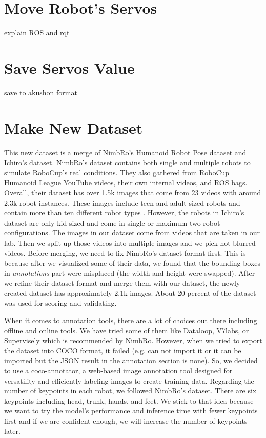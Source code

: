 \section{Move Robot's Servos}
\label{sec:move-robot-servo}

explain ROS and rqt


\section{Save Servos Value}
\label{sec:save-servo-value}

save to akushon format

\section{Make New Dataset}
\label{sec:makenewdataset}

This new dataset is a merge of NimbRo's Humanoid Robot Pose dataset and Ichiro's dataset. NimbRo's dataset contains both single and multiple robots to
simulate RoboCup's real conditions. They also gathered from RoboCup Humanoid League YouTube videos, their own internal videos, and ROS bags. 
Overall, their dataset has over 1.5k images that come from 23 videos with around 2.3k robot instances. These images include teen and adult-sized robots and contain more than ten different robot types \parencite{amini2021}.
However, the robots in Ichiro's dataset are only kid-sized and come in single or maximum two-robot configurations. The images in our dataset come from videos that are taken in our lab. 
Then we split up those videos into multiple images and we pick not blurred videos.
Before merging, we need to fix NimbRo's dataset format first. This is because after we visualized some of their data, we found that the bounding boxes in \emph{annotations} part were misplaced (the width and height were swapped).
After we refine their dataset format and merge them with our dataset, the newly created dataset has approximately 2.1k images.
About 20 percent of the dataset was used for scoring and validating.

When it comes to annotation tools, there are a lot of choices out there including offline and online tools. We have tried some of them like Dataloop, V7labs, or Supervisely which is recommended by NimbRo.
However, when we tried to export the dataset into COCO format, it failed (e.g. can not import it or it can be imported but the JSON result in the annotation section is none). So, we decided to use a coco-annotator,
a web-based image annotation tool designed for versatility and efficiently labeling images to create training data. Regarding the number of keypoints in each robot, we followed NimbRo's dataset.
There are six keypoints including head, trunk, hands, and feet. We stick to that idea because we want to try the model's performance and inference time with fewer keypoints first and if we are confident enough, we will increase the number of keypoints later.


